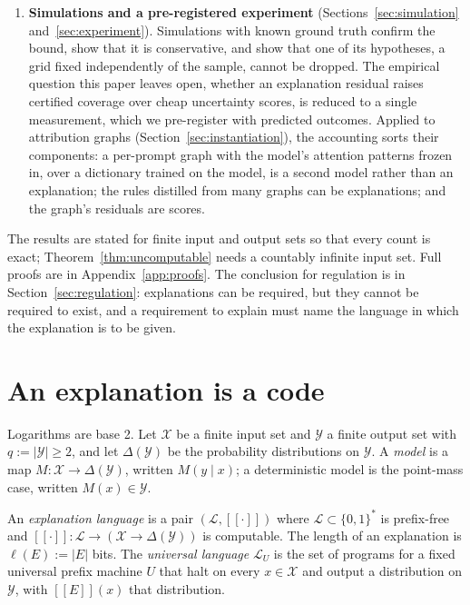 \documentclass[11pt,letterpaper]{article}
\newcommand{\sem}[1]{[\![#1]\!]}
\newcommand{\X}{\mathcal{X}}
\newcommand{\Y}{\mathcal{Y}}
\newcommand{\Lang}{\mathcal{L}}
\newcommand{\LU}{\Lang_{U}}
\theoremstyle{plain}
\theoremstyle{definition}
\theoremstyle{remark}
\begin{document}
\begin{enumerate}[leftmargin=1.6em]
\item \textbf{Simulations and a pre-registered experiment} (Sections~\ref{sec:simulation} and~\ref{sec:experiment}). Simulations with known ground truth confirm the bound, show that it is conservative, and show that one of its hypotheses, a grid fixed independently of the sample, cannot be dropped. The empirical question this paper leaves open, whether an explanation residual raises certified coverage over cheap uncertainty scores, is reduced to a single measurement, which we pre-register with predicted outcomes. Applied to attribution graphs (Section~\ref{sec:instantiation}), the accounting sorts their components: a per-prompt graph with the model's attention patterns frozen in, over a dictionary trained on the model, is a second model rather than an explanation; the rules distilled from many graphs can be explanations; and the graph's residuals are scores.
\end{enumerate}

The results are stated for finite input and output sets so that every count is exact; Theorem~\ref{thm:uncomputable} needs a countably infinite input set. Full proofs are in Appendix~\ref{app:proofs}. The conclusion for regulation is in Section~\ref{sec:regulation}: explanations can be required, but they cannot be required to exist, and a requirement to explain must name the language in which the explanation is to be given.

\section{An explanation is a code}
\label{sec:setting}

Logarithms are base 2. Let $\X$ be a finite input set and $\Y$ a finite output set with $q := |\Y| \ge 2$, and let $\Delta(\Y)$ be the probability distributions on $\Y$. A \emph{model} is a map $M:\X\to\Delta(\Y)$, written $M(y\mid x)$; a deterministic model is the point-mass case, written $M(x)\in\Y$.

An \emph{explanation language} is a pair $(\Lang,\sem{\cdot})$ where $\Lang\subset\{0,1\}^{*}$ is prefix-free and $\sem{\cdot}:\Lang\to(\X\to\Delta(\Y))$ is computable. The length of an explanation is $\ell(E):=|E|$ bits. The \emph{universal language} $\LU$ is the set of programs for a fixed universal prefix machine $U$ that halt on every $x\in\X$ and output a distribution on $\Y$, with $\sem{E}(x)$ that distribution.
\end{document}
